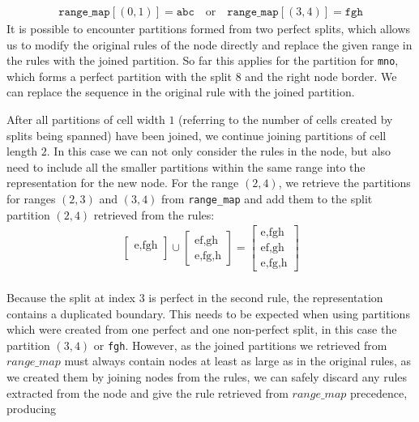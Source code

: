 %
\begin{align*}
    \texttt{range\_map}[(0, 1)] = \texttt{abc}
    \quad
    \text{or}
    \quad
    \texttt{range\_map}[(3, 4)] = \texttt{fgh}
\end{align*}
%
It is possible to encounter partitions formed from two perfect splits, which allows us to modify the original rules of the node directly and replace the given range in the rules with the joined partition. So far this applies for the partition for \texttt{mno}, which forms a perfect partition with the split $8$ and the right node border. We can replace the sequence in the original rule with the joined partition.

\noindent
After all partitions of cell width $1$ (referring to the number of cells created by
splits being spanned) have been joined, we continue joining partitions of cell length $2$. In this case we can not only consider the rules in the node, but also need to include all the smaller partitions within the same range into the representation for the new node. For the range $(2, 4)$, we retrieve the partitions for ranges $(2,3)$ and $(3,4)$ from \texttt{range\_map} and add them to the split partition $(2,4)$ retrieved from the rules:
%
{
    \ttfamily
    \noindent
    \begin{align*}
        \begin{bmatrix}
            \text{e,fgh}\\
        \end{bmatrix}
        \cup
        \begin{bmatrix}
            \text{ef,gh}\\
            \text{e,fg,h}
        \end{bmatrix}
        =
        \begin{bmatrix}
            \text{e,fgh}\\
            \text{ef,gh}\\
            \text{e,fg,h}
        \end{bmatrix}
    \end{align*}
}\\
%
\noindent Because the split at index $3$ is perfect in the second rule, the representation contains a duplicated boundary. This needs to be expected when using partitions which were created from one perfect and one non-perfect split, in this case the partition $(3,4)$ or \texttt{fgh}. However, as the joined partitions we retrieved from $range\_map$ must always contain nodes at least as large as in the original rules, as we created them by joining nodes from the rules, we can safely discard any rules extracted from the node and give the rule retrieved from $range\_map$ precedence, producing 

